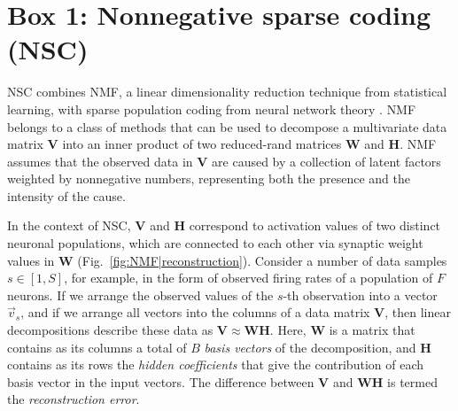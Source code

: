 

\section{Box 1: Nonnegative sparse coding (NSC)}
\label{box:NSC}


\Acf{NSC} combines \acf{NMF},
a linear dimensionality reduction technique from statistical learning,
with sparse population coding from neural network theory
\citep{Hoyer2002,EggertKorner2004}.
\ac{NMF} belongs to a class of methods that can be used to decompose
a multivariate data matrix \textbf{V}
into an inner product of two reduced-rand matrices \textbf{W} and \textbf{H}.
\ac{NMF} assumes that the observed data in \textbf{V} are caused by a collection
of latent factors weighted by nonnegative numbers,
representing both the presence and the intensity of the cause.

In the context of \ac{NSC},
\textbf{V} and \textbf{H} correspond to activation values
of two distinct neuronal populations,
which are connected to each other via synaptic weight values
in \textbf{W}
(Fig.~\ref{fig:NMF|reconstruction}).
Consider a number of data samples $s \in [1, S]$, for example,
in the form of observed firing rates of a population of $F$ neurons.
If we arrange the observed values of the $s$-th observation 
into a vector $\vec{v}_s$,
and if we arrange all vectors into the columns of a data matrix \textbf{V},
then linear decompositions describe these data as
$\mathbf{V} \approx \mathbf{WH}$.
Here, \textbf{W} is a matrix that contains as its columns
a total of $B$ \emph{basis vectors} of the decomposition, 
and \textbf{H} contains as its rows the \emph{hidden coefficients}
that give the contribution of each basis vector in the input vectors.
The difference between \textbf{V} and \textbf{WH} is termed
the \emph{reconstruction error}.

